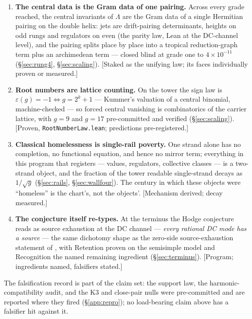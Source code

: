 \documentclass[11pt]{article}
\theoremstyle{definition}
\theoremstyle{remark}
\begin{document}
\begin{enumerate}
\item \textbf{The central data is the Gram data of one pairing.} Across every
grade reached, the central invariants of $\Lambda$ are the Gram data of a
single Hermitian pairing on the double helix: jets are drift-pairing
determinants, heights on odd rungs and regulators on even (the parity law,
Lean at the DC-channel level), and the pairing splits place by place into a
tropical reduction-graph term plus an archimedean term --- closed blind at
grade one to $4\times10^{-11}$ (\S\ref{sec:rung4}, \S\ref{sec:scaling}).
[Staked as the unifying law; its faces individually proven or measured.]

\item \textbf{Root numbers are lattice counting.} On the tower the sign law is
$\varepsilon(g)=-1\iff g=2^k+1$ --- Kummer's valuation of a central binomial,
machine-checked --- so forced central vanishing is combinatorics of the
carrier lattice, with $g=9$ and $g=17$ pre-committed and verified
(\S\ref{sec:scaling}). [Proven, \texttt{RootNumberLaw.lean}; predictions
pre-registered.]

\item \textbf{Classical homelessness is single-rail poverty.} One strand
alone has no completion, no functional equation, and hence no mirror term;
everything in this program that registers --- values, regulators, collective
classes --- is a two-strand object, and the fraction of the tower readable
single-strand decays as $1/\sqrt g$ (\S\ref{sec:rails},
\S\ref{sec:wallfour}). The century in which these objects were ``homeless''
is the chart's, not the objects'. [Mechanism derived; decay measured.]

\item \textbf{The conjecture itself re-types.} At the terminus the Hodge
conjecture reads as source exhaustion at the DC channel --- \emph{every
rational DC mode has a source} --- the same dichotomy shape as the zero-side
source-exhaustion statement of \cite{Universal}, with Retention proven on the
semisimple model and Recognition the named remaining ingredient
(\S\ref{sec:terminus}). [Program; ingredients named, falsifiers stated.]
\end{enumerate}

\noindent The falsification record is part of the claim set: the support law,
the harmonic-compatibility audit, and the K3 and close-pair nulls were
pre-committed and are reported where they fired (\S\ref{app:repro}); no
load-bearing claim above has a falsifier hit against it.
\end{document}
